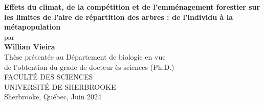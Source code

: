 \documentclass[12pt,oneside]{book}
\newcommand{\blankpage}{	%
\newpage
\thispagestyle{empty}
\mbox{}
\newpage
}
\begin{document}
\blankpage
\blankpage


\renewcommand{\figurename}{Figure}
\renewcommand{\tablename}{Table} 		%
\renewcommand{\chaptername}{CHAPITRE} 
\renewcommand{\contentsname}{TABLE DES MATIÈRES}
\renewcommand{\listtablename}{LISTE DES TABLEAUX}
\renewcommand{\listfigurename}{LISTE DES FIGURES}



\singlespacing
\begin{center}
{
{\textbf{Effets du climat, de la compétition et de l'emménagement forestier sur les limites de l'aire de répartition des arbres : de l'individu à la métapopulation}} %
\\  \vspace{2.5cm}
par
\\   \vspace{2.5cm}
{\textbf{Willian Vieira}} %
\\   \vspace{2.5cm}
Thèse présentée au Département de biologie en vue\\
de l'obtention du grade de docteur ès sciences (Ph.D.)\\
\vfill
FACULTÉ DES SCIENCES\\
UNIVERSITÉ DE SHERBROOKE\\  \vspace{1.5cm}
\vfill
Sherbrooke, Québec, Juin 2024
}

\end{center}


\end{document}
